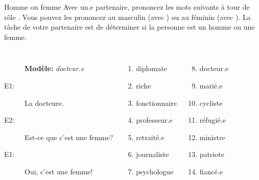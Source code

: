 \begin{frame}{Homme ou femme}
  Avec un.e partenaire, prononcez les mots suivants à tour de rôle .
  Vous pouvez les prononcez au masculin (avec ) ou au féminin (avec ).
  La tâche de votre partenaire est de déterminer si la personne est un homme ou une femme.
  \begin{columns}
      \begin{description}
        \item[] \textbf{Modèle:} \emph{docteur.e}
        \item[E1:] La docteure.
        \item[E2:] Est-ce que c'est une femme?
        \item[E1:] Oui, c'est une femme!
      \end{description}
      \begin{enumerate}
        \item diplomate
        \item riche
        \item fonctionnaire
        \item professeur.e
        \item retraité.e
        \item journaliste
        \item psychologue
      \end{enumerate}
      \begin{enumerate}
        \setcounter{enumi}{7}
        \item docteur.e
        \item marié.e
        \item cycliste
        \item réfugié.e
        \item ministre
        \item patriote
        \item fiancé.e
      \end{enumerate}
  \end{columns}
\end{frame}